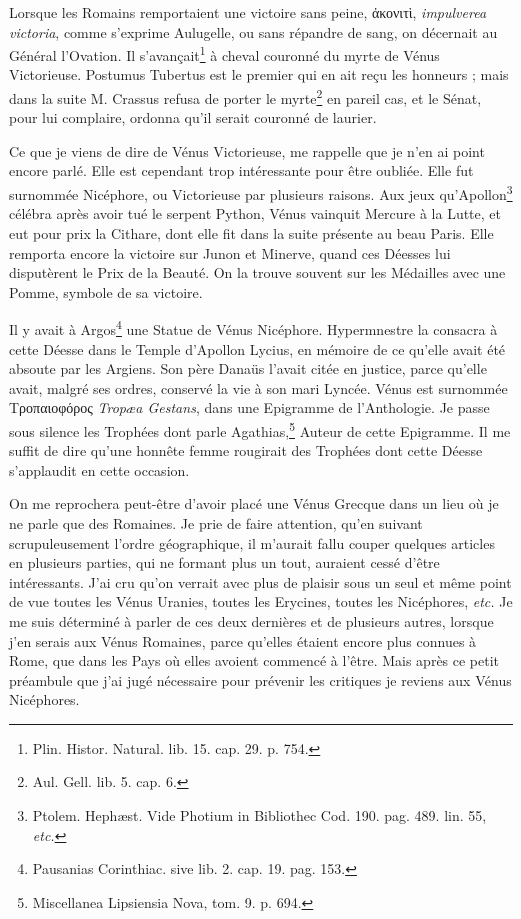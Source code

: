 \documentclass[a4paper, 11pt, oneside, polutonikogreek, french]{article}
\begin{document}
Lorsque les Romains remportaient une victoire sans peine, ἀκονιτὶ, \emph{impulverea victoria}, comme s'exprime Aulugelle, ou sans répandre de sang, on décernait au Général l'Ovation. Il s'avançait\footnote{Plin. Histor. Natural. lib. 15. cap. 29. p. 754.} à cheval couronné du myrte de Vénus Victorieuse. Postumus Tubertus est le premier qui en ait reçu les honneurs ; mais dans la suite M. Crassus refusa de porter le myrte\footnote{Aul. Gell. lib. 5. cap. 6.} en pareil cas, et le Sénat, pour lui complaire, ordonna qu'il serait couronné de laurier.

Ce que je viens de dire de Vénus Victorieuse, me rappelle que je n'en ai point encore parlé. Elle est cependant trop intéressante pour être oubliée. Elle fut surnommée Nicéphore, ou Victorieuse par plusieurs raisons. Aux jeux qu'Apollon\footnote{Ptolem. Hephæst. Vide Photium in Bibliothec Cod. 190. pag. 489. lin. 55, \emph{etc.}} célébra après avoir tué le serpent Python, Vénus vainquit Mercure à la Lutte, et eut pour prix la Cithare, dont elle fit dans la suite présente au beau Paris. Elle remporta encore la victoire sur Junon et Minerve, quand ces Déesses lui disputèrent le Prix de la Beauté. On la trouve souvent sur les Médailles avec une Pomme, symbole de sa victoire.

Il y avait à Argos\footnote{Pausanias Corinthiac. sive lib. 2. cap. 19. pag. 153.} une Statue de Vénus Nicéphore. Hypermnestre la consacra à cette Déesse dans le Temple d'Apollon Lycius, en mémoire de ce qu'elle avait été absoute par les Argiens. Son père Danaüs l'avait citée en justice, parce qu'elle avait, malgré ses ordres, conservé la vie à son mari Lyncée. Vénus est surnommée Τροπαιοφόρος \emph{Tropæa Gestans}, dans une Epigramme de l'Anthologie. Je passe sous silence les Trophées dont parle Agathias,\footnote{Miscellanea Lipsiensia Nova, tom. 9. p. 694.} Auteur de cette Epigramme. Il me suffit de dire qu'une honnête femme rougirait des Trophées dont cette Déesse s'applaudit en cette occasion.

On me reprochera peut-être d'avoir placé une Vénus Grecque dans un lieu où je ne parle que des Romaines. Je prie de faire attention, qu'en suivant scrupuleusement l'ordre géographique, il m'aurait fallu couper quelques articles en plusieurs parties, qui ne formant plus un tout, auraient cessé d'être intéressants. J'ai cru qu'on verrait avec plus de plaisir sous un seul et même point de vue toutes les Vénus Uranies, toutes les Erycines, toutes les Nicéphores, \emph{etc.} Je me suis déterminé à parler de ces deux dernières et de plusieurs autres, lorsque j'en serais aux Vénus Romaines, parce qu'elles étaient encore plus connues à Rome, que dans les Pays où elles avoient commencé à l'être. Mais après ce petit préambule que j'ai jugé nécessaire pour prévenir les critiques je reviens aux Vénus Nicéphores.
\end{document}
